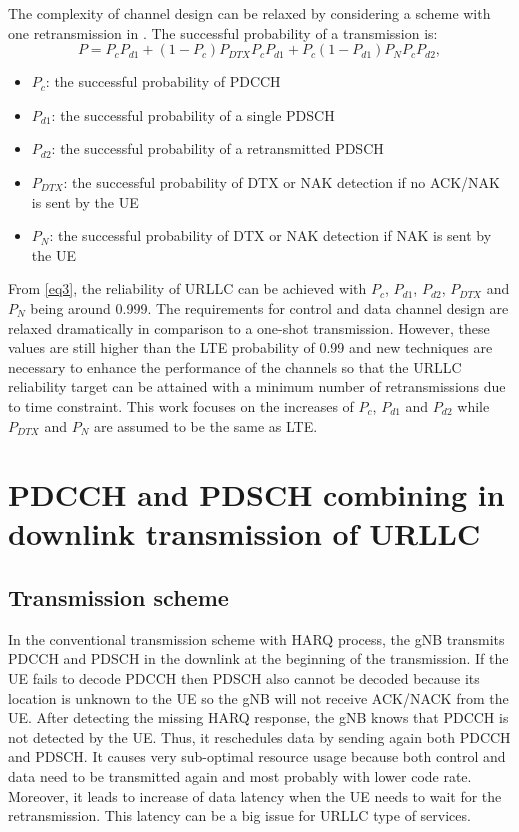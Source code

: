 \documentclass[conference]{IEEEtran}
\begin{document}
The complexity of channel design can be relaxed by considering a scheme with one retransmission in \cite{b7}. The successful probability of a transmission is:
\begin{equation}
P = P_{c}P_{d1} + (1-P_{c})P_{DTX}P_{c}P_{d1} + P_{c}(1-P_{d1})P_{N}P_{c}P_{d2},\label{eq3}
\end{equation}
\begin{itemize}
    \item $P_{c}$: the successful probability of PDCCH
    \item $P_{d1}$: the successful probability of a single PDSCH
    \item $P_{d2}$: the successful probability of a retransmitted PDSCH
    \item $P_{DTX}$: the successful probability of DTX or NAK detection if no ACK/NAK is sent by the UE
    \item $P_{N}$: the successful probability of DTX or NAK detection if NAK is sent by the UE
\end{itemize}

From \eqref{eq3}, the reliability of URLLC can be achieved with $P_{c}$, $P_{d1}$, $P_{d2}$, $P_{DTX}$ and $P_{N}$ being around 0.999. The requirements for control and data channel design are relaxed dramatically in comparison to a one-shot transmission. However, these values are still higher than the LTE probability of 0.99 and new techniques are necessary to enhance the performance of the channels so that the URLLC reliability target can be attained with a minimum number of retransmissions due to time constraint. This work focuses on the increases of $P_{c}$, $P_{d1}$ and $P_{d2}$ while $P_{DTX}$ and $P_{N}$ are assumed to be the same as LTE.

\section{PDCCH and PDSCH combining in downlink transmission of URLLC}

\subsection{Transmission scheme}\label{AA}
In the conventional transmission scheme with HARQ process, the gNB transmits PDCCH and PDSCH in the downlink at the beginning of the transmission. If the UE fails to decode PDCCH then PDSCH also cannot be decoded because its location is unknown to the UE so the gNB will not receive ACK/NACK from the UE. After detecting the missing HARQ response, the gNB knows that PDCCH is not detected by the UE. Thus, it reschedules data by sending again both PDCCH and PDSCH. It causes very sub-optimal resource usage because both control and data need to be transmitted again and most probably with lower code rate. Moreover, it leads to increase of data latency when the UE needs to wait for the retransmission. This latency can be a big issue for URLLC type of services. 
\end{document}

